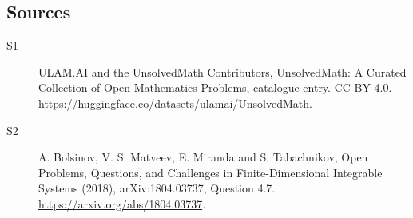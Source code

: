 \documentclass[11pt]{article}
\begin{document}
\subsection{Sources}
\begin{description}
\item[\hypertarget{source:statement:1}{S1}] ULAM.AI and the UnsolvedMath Contributors, UnsolvedMath: A Curated Collection of Open Mathematics Problems, catalogue entry. CC BY 4.0. \url{https://huggingface.co/datasets/ulamai/UnsolvedMath}.
\item[\hypertarget{source:statement:2}{S2}] A. Bolsinov, V. S. Matveev, E. Miranda and S. Tabachnikov, Open Problems, Questions, and Challenges in Finite-Dimensional Integrable Systems (2018), arXiv:1804.03737, Question 4.7. \url{https://arxiv.org/abs/1804.03737}.
\end{description}
\label{end:statement}
\end{document}
